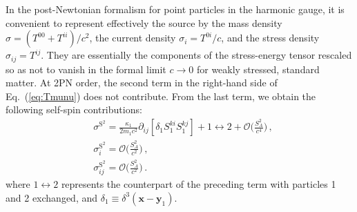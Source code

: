 \documentclass[aps, prd,
twocolumn,%
superscriptaddress,
showpacs, nofootinbib, eqsecnum, amsmath, amssymb, floatfix
]{revtex4}
\begin{document}
In the post-Newtonian formalism for point particles in the harmonic gauge, it
is convenient to represent effectively the source by the mass density $\sigma
= (T^{00}+T^{ii})/c^2$, the current density $\sigma_i = T^{0i}/c$, and the
stress density $\sigma_{ij}= T^{ij}$. They are essentially the components of
the stress-energy tensor rescaled so as not to vanish in the formal limit $c
\to 0$ for weakly stressed, standard matter. At 2PN order, the second term in
the right-hand side of Eq.~(\ref{eq:Tmunu}) does not contribute. From the
last term, we obtain the following self-spin
contributions:
%
\begin{subequations}
\begin{align} \label{eq:sigma}
& \sigma^{\text{S}^2} = \frac{\kappa_1}{2 m_1 c^2} \partial_{ij} [\delta_1
S_1^{ki} S_1^{kj}]
+ 1 \leftrightarrow 2 + \mathcal{O}\Big(\frac{S_A^2}{c^4} \Big) \, ,\\
& \sigma^{\text{S}^2}_i =  \mathcal{O}\Big(\frac{S_A^2}{c^2}\Big) \, , \\
& \sigma^{\text{S}^2}_{ij} =  \mathcal{O}\Big(\frac{S_A^2}{c^2}\Big) \, .
\end{align}
\end{subequations}
%
where $1 \leftrightarrow 2$ represents the counterpart of the
preceding term with particles 1 and 2 exchanged, and $\delta_1
\equiv \delta^3(\bm{x}-\bm{y}_1)$.
\end{document}

